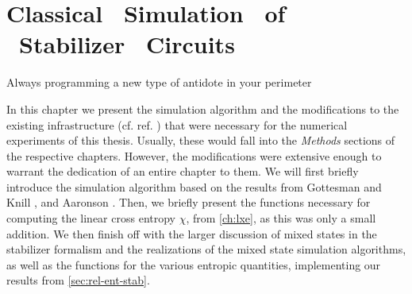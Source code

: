 \chapter{Classical \ Simulation \ of \ Stabilizer \ Circuits}
\label{ch:mixed}
\epigraph{Always programming a new type of antidote in your perimeter}{
\citeauthor{quasimotoDiscipline99Pt2000}
}

In this chapter we present the simulation algorithm and 
the modifications to the existing infrastructure (cf. ref.
\cite{langCliffordCircuitSimulator2022}) that
were necessary for the numerical experiments of this thesis. Usually, these
would fall into the \emph{Methods} sections of the respective
chapters. However, the modifications were extensive enough to warrant the
dedication of an entire chapter to them. We will first briefly introduce the
simulation algorithm based on the results from Gottesman and Knill
\cite{gottesmanHeisenbergRepresentationQuantum1998}, and Aaronson
\cite{aaronsonImprovedSimulationStabilizer2004}. Then, we briefly present
the functions
necessary for computing the linear cross entropy $\chi$, from \cref{ch:lxe}, as
this was only a small addition. We
then finish off with the larger discussion of mixed states in the stabilizer
formalism and the realizations of the mixed state simulation algorithms, as
well as the functions for the various entropic quantities, implementing our
results from \cref{sec:rel-ent-stab}.

%
%
%
%
%

